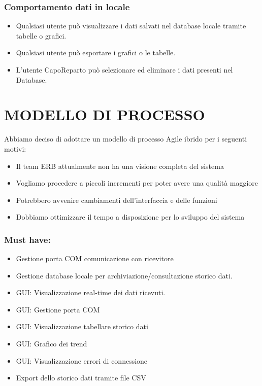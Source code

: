 \documentclass{report}
\begin{document}
\subsection{Comportamento dati in locale}
\begin{itemize}
\item Qualsiasi utente può visualizzare i dati salvati nel database locale tramite tabelle o grafici.
\item Qualsiasi utente può esportare i grafici o le tabelle.
\item L’utente CapoReparto può selezionare ed eliminare i dati presenti nel Database.
\end{itemize}





\chapter{MODELLO DI PROCESSO}
Abbiamo deciso di adottare un modello di processo Agile ibrido per i seguenti motivi:
\begin{itemize}
\item Il team ERB attualmente non ha una visione completa del sistema
\item Vogliamo procedere a piccoli incrementi per poter avere una qualità maggiore 
\item Potrebbero avvenire cambiamenti dell'interfaccia e delle funzioni
\item Dobbiamo ottimizzare il tempo a disposizione per lo sviluppo del sistema
\end{itemize}

\subsection*{Must have:}
\begin{itemize}
\item Gestione porta COM comunicazione con ricevitore
\item Gestione database locale per archiviazione/consultazione storico dati.
\item GUI: Visualizzazione real-time dei dati ricevuti.
\item GUI: Gestione porta COM 
\item GUI: Visualizzazione tabellare storico dati
\item GUI: Grafico dei trend 
\item GUI: Visualizzazione errori di connessione
\item Export dello storico dati tramite file CSV
\end{itemize}
\end{document}

